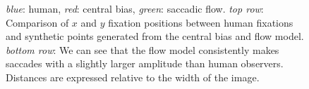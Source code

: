 \documentclass[a4paper, twocolumn, oneside, 10pt]{article}
\begin{document}
\begin{figure}[htb]
\centering
{}
\caption{\textit{blue}: human, \textit{red}: central bias, \textit{green}: saccadic flow. \textit{top row}: Comparison of $x$ and $y$ fixation positions between human fixations and synthetic points generated from the central bias and flow model. \textit{bottom row}: We can see that the flow model consistently makes saccades with a slightly larger amplitude than human observers. Distances are expressed relative to the width of the image.}
\label{fig:flowHumanComp}
\end{figure}
\end{document}
